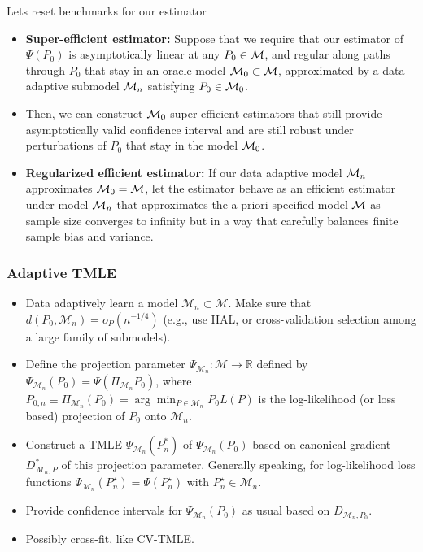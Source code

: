 \documentclass[t]{beamer}
\begin{document}
\begin{frame}{Lets reset benchmarks for our estimator}
\begin{itemize}
\item {\bf Super-efficient estimator:}
Suppose that we require that our estimator of $\Psi(P_0)$ is asymptotically linear at any $P_0\in {\cal M}$, and regular along paths through $P_0$ that stay in an oracle model ${\cal M}_0\subset {\cal M}$, approximated by a data adaptive submodel ${\cal M}_n$ satisfying $P_0\in {\cal M}_0$.
\item Then, we can construct ${\cal M}_0$-super-efficient estimators that still provide asymptotically valid confidence interval and are still robust under perturbations of $P_0$ that stay in the model ${\cal M}_0$.
\item {\bf Regularized efficient estimator:} If our data adaptive model ${\cal M}_n$ approximates ${\cal M}_0={\cal M}$, let the estimator behave as an efficient estimator under model ${\cal M}_n$ that approximates the a-priori specified model ${\cal M}$ as sample size converges to infinity but in a way that carefully balances finite sample bias and variance.
\end{itemize}
\end{frame}

\begin{frame}
\frametitle{Adaptive TMLE}
\begin{itemize}
\item Data adaptively learn a model $\mathcal{M}_n \subset \mathcal{M}$. Make
sure that $d(P_0, \mathcal{M}_n)=o_P(n^{-1/4})$ (e.g., use HAL, or
cross-validation selection among a large family of submodels).
\item Define the projection parameter
$\Psi_{\mathcal{M}_n}:\mathcal{M} \rightarrow \mathbb{R}$ defined by
$\Psi_{\mathcal{M}_n}(P_0)=\Psi(\Pi_{\mathcal{M}_n}P_0)$, where $P_{0,n}\equiv
\Pi_{\mathcal{M}_n}(P_0)=\arg\min_{P \in \mathcal{M}_n} P_0L(P)$ is the log-likelihood (or loss
based) projection of $P_0$ onto $\mathcal{M}_n$.
\item Construct a TMLE $\Psi_{\mathcal{M}_n}(P_n^*)$ of
$\Psi_{\mathcal{M}_n}(P_0)$ based on canonical gradient $D^*_{\mathcal{M}_n,P}$
of this projection parameter.
Generally speaking, for log-likelihood loss functions
$\Psi_{\mathcal{M}_n}(P_n^{\star})=\Psi(P_n^{\star})$ with $P_n^{\star} \in
\mathcal{M}_n$.
\item Provide confidence intervals for $\Psi_{\mathcal{M}_n}(P_0)$ as usual
based on $D_{\mathcal{M}_n,P_0}$.
\item Possibly cross-fit, like CV-TMLE.
\end{itemize}
\end{frame}
\end{document}
